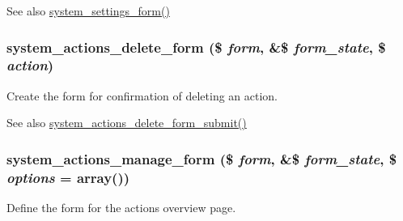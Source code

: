 \begin{DoxySeeAlso}{See also}
\hyperlink{group__forms_ga6fb270d34465d846cd4659a85d3e40c8}{system\_\-settings\_\-form()} 
\end{DoxySeeAlso}
\hypertarget{group__forms_ga50d446212b0733af3d5248645233889b}{
\subsubsection[{system\_\-actions\_\-delete\_\-form}]{\setlength{\rightskip}{0pt plus 5cm}system\_\-actions\_\-delete\_\-form (\$ {\em form}, \/  \&\$ {\em form\_\-state}, \/  \$ {\em action})}}
\label{group__forms_ga50d446212b0733af3d5248645233889b}
Create the form for confirmation of deleting an action.

\begin{DoxySeeAlso}{See also}
\hyperlink{system_8admin_8inc_ad081e1fe2621d62873254449a097f2e7}{system\_\-actions\_\-delete\_\-form\_\-submit()} 
\end{DoxySeeAlso}
\hypertarget{group__forms_gaa4836604ff53f110b7305b227cfb6344}{
\subsubsection[{system\_\-actions\_\-manage\_\-form}]{\setlength{\rightskip}{0pt plus 5cm}system\_\-actions\_\-manage\_\-form (\$ {\em form}, \/  \&\$ {\em form\_\-state}, \/  \$ {\em options} = {\ttfamily array()})}}
\label{group__forms_gaa4836604ff53f110b7305b227cfb6344}
Define the form for the actions overview page.


